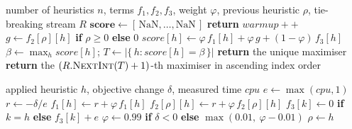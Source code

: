 \begin{algorithm}[htbp]
\caption{Modified Choice Function, selection step. The warm-up pass guarantees at least
one observation of $f_1$ per heuristic before any score is used.}
\label{alg:cfselect}
\begin{algorithmic}[1]
\Require number of heuristics $n$, terms $f_1, f_2, f_3$, weight $\varphi$,
         previous heuristic $\rho$, tie-breaking stream $R$
  \State $\textbf{score} \gets [\,\mathrm{NaN}, \ldots, \mathrm{NaN}\,]$
  \State \textbf{return} $\textit{warmup}{+}{+}$
\EndIf
{}
  \State $g \gets f_2[\rho][h]$ \textbf{if} $\rho \geq 0$ \textbf{else} $0$
  \State $\textit{score}[h] \gets \varphi\, f_1[h] + \varphi\, g + (1-\varphi)\, f_3[h]$
\EndFor
\State $\beta \gets \max_h \textit{score}[h]$;\quad
       $T \gets |\{\, h : \textit{score}[h] = \beta \,\}|$
  \State \textbf{return} the unique maximiser 
\EndIf
\State \textbf{return} the $(R.\textsc{NextInt}(T)+1)$-th maximiser in ascending index order
\end{algorithmic}
\end{algorithm}

\begin{algorithm}[htbp]
\caption{Modified Choice Function, update step. The adaptive weight $\varphi$ follows
Drake, \"{O}zcan and Burke (2012): it snaps to $0.99$ on improvement and decays by
$0.01$ otherwise, shifting weight from performance towards idle time as the search stalls.}
\label{alg:cfupdate}
\begin{algorithmic}[1]
\Require applied heuristic $h$, objective change $\delta$, measured time $\textit{cpu}$
\State $e \gets \max(\textit{cpu}, 1)$ 
\State $r \gets -\delta / e$ 
\State $f_1[h] \gets r + \varphi\, f_1[h]$
  \State $f_2[\rho][h] \gets r + \varphi\, f_2[\rho][h]$
\EndIf
{}
  \State $f_3[k] \gets 0$ \textbf{if} $k = h$ \textbf{else} $f_3[k] + e$
\EndFor
\State $\varphi \gets 0.99$ \textbf{if} $\delta < 0$ \textbf{else} $\max(0.01,\ \varphi - 0.01)$
\State $\rho \gets h$
\end{algorithmic}
\end{algorithm}

